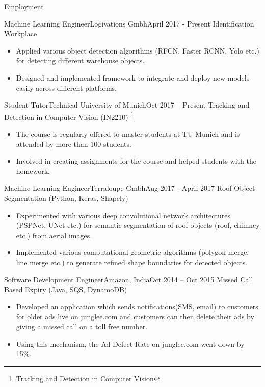 \documentclass[]{mcdowellcv}
\begin{document}
	\begin{cvsection}{Employment}
		\begin{cvsubsection}{Machine Learning Engineer}{Logivations Gmbh}{April 2017 - Present}
			Identification Workplace			
			\begin{itemize}
				\item Applied various object detection algorithms (RFCN, Faster RCNN, Yolo etc.) for detecting different warehouse objects.
				\item Designed and implemented framework to integrate and deploy new models easily across different platforms.
			\end{itemize}
		\end{cvsubsection}
		
		\begin{cvsubsection}{Student Tutor}{Technical University of Munich}{Oct 2017 -- Present}	
		Tracking and Detection in Computer Vision (IN2210) \footnote{\href{http://campar.in.tum.de/Chair/TeachingWs17TDCV}{Tracking and Detection in Computer Vision}}
			\begin{itemize}
				\item The course is regularly offered to master students at TU Munich and is attended by more than 100 students. 
				\item Involved in creating assignments for the course and helped students with the homework. 
			\end{itemize}
		\end{cvsubsection}
		
		\begin{cvsubsection}{Machine Learning Engineer}{Terraloupe Gmbh}{Aug 2017 - April 2017}
			Roof Object Segmentation (Python, Keras, Shapely)
			\begin{itemize}
				\item Experimented with various deep convolutional network architectures (PSPNet, UNet etc.) for semantic segmentation of roof objects (roof, chimney etc.) from aerial images.
				\item Implemented various computational geometric algorithms (polygon merge, line merge etc.) to generate refined shape boundaries for detected objects.
			\end{itemize}
		\end{cvsubsection}
		
		\begin{cvsubsection}{Software Development Engineer}{Amazon, India}{Oct 2014 -- Oct 2015}		
		Missed Call Based Expiry (Java, SQS, DynamoDB)
			\begin{itemize}
				\item Developed an application which sends notifications(SMS, email) to customers for older ads live on junglee.com and customers can then delete their ads by giving a missed call on a toll free number. 
                \item Using this mechanism, the Ad Defect Rate on junglee.com went down by 15\%.
			\end{itemize}
		\end{cvsubsection}
		

\end{cvsection}
\end{document}
